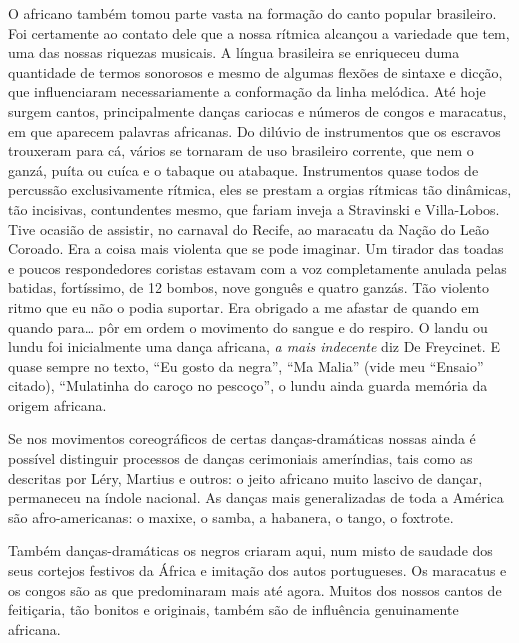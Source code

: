 O africano também tomou parte vasta na formação do canto popular
brasileiro. Foi certamente ao contato dele que a nossa rítmica alcançou
a variedade que tem, uma das nossas riquezas musicais. A língua
brasileira se enriqueceu duma quantidade de termos sonorosos e mesmo de
algumas flexões de sintaxe e dicção, que influenciaram necessariamente a
conformação da linha melódica. Até hoje surgem cantos, principalmente
danças cariocas e números de congos e maracatus, em que aparecem
palavras africanas. Do dilúvio de instrumentos que os escravos trouxeram
para cá, vários se tornaram de uso brasileiro corrente, que nem o ganzá,
puíta ou cuíca e o tabaque ou atabaque. Instrumentos quase todos de
percussão exclusivamente rítmica, eles se prestam a orgias rítmicas tão
dinâmicas, tão incisivas, contundentes mesmo, que fariam inveja a
Stravinski e Villa-Lobos. Tive ocasião de assistir, no carnaval do
Recife, ao maracatu da Nação do Leão Coroado. Era a coisa mais violenta
que se pode imaginar. Um tirador das toadas e poucos respondedores
coristas estavam com a voz completamente anulada pelas batidas,
fortíssimo, de 12 bombos, nove gonguês e quatro ganzás. Tão violento
ritmo que eu não o podia suportar. Era obrigado a me afastar de quando
em quando para\ldots{} pôr em ordem o movimento do sangue e do respiro. O
landu ou lundu foi inicialmente uma dança africana, \textit{a mais indecente}
diz De Freycinet. E quase sempre no texto, ``Eu gosto da negra'', ``Ma
Malia'' (vide meu ``Ensaio'' citado), ``Mulatinha do caroço no
pescoço'', o lundu ainda guarda memória da origem africana.

Se nos movimentos coreográficos de certas danças-dramáticas nossas ainda
é possível distinguir processos de danças cerimoniais ameríndias, tais
como as descritas por Léry, Martius e outros: o jeito africano muito
lascivo de dançar, permaneceu na índole nacional. As danças mais
generalizadas de toda a América são afro-americanas: o maxixe, o samba,
a habanera, o tango, o foxtrote.

Também danças-dramáticas os negros criaram aqui, num misto de saudade
dos seus cortejos festivos da África e imitação dos autos portugueses.
Os maracatus e os congos são as que predominaram mais até agora. Muitos
dos nossos cantos de feitiçaria, tão bonitos e originais, também são de
influência genuinamente africana.

